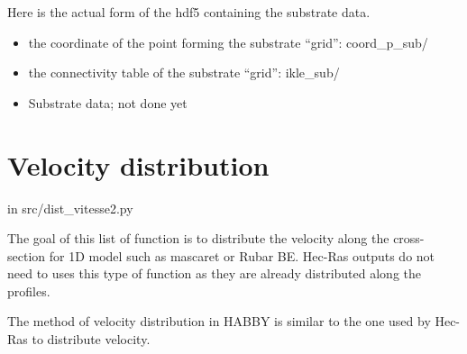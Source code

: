 \documentclass[letterpaper,10pt,english]{sphinxmanual}
\begin{document}
Here is the actual form of the hdf5 containing the substrate data.
\begin{itemize}
\item {} 
the coordinate of the point forming the substrate ``grid'': coord\_p\_sub/

\item {} 
the connectivity table of the substrate ``grid'': ikle\_sub/

\item {} 
Substrate data; not done yet

\end{itemize}


\section{Velocity distribution}
\label{\detokenize{index:velocity-distribution}}
in src/dist\_vitesse2.py

The goal of this list of function is to distribute the velocity along the cross-section
for 1D model such as mascaret or Rubar BE. Hec-Ras outputs do not need to uses this type
of function as they are already distributed along the profiles.

The method of velocity distribution in HABBY is similar to the one used by Hec-Ras to distribute
velocity.
\label{\detokenize{index:module-src.dist_vistess2}}
\end{document}
